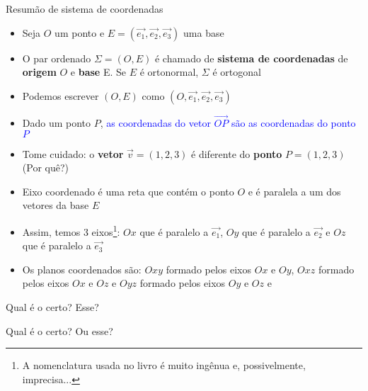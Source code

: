 \begin{frame}{Resumão de sistema de coordenadas}
    \begin{itemize}
        \item Seja \(O\) um ponto e \(E=(\vec{e_1},\vec{e_2},\vec{e_3})\) uma base
        \item O par ordenado \(\Sigma = (O,E)\) é chamado de \textbf{sistema de coordenadas} de \textbf{origem} 
            \(O\) e \textbf{base} E. Se \(E\) é ortonormal, \(\Sigma\) é ortogonal
        \item Podemos escrever \((O,E)\) como \((O,\vec{e_1},\vec{e_2},\vec{e_3})\)
        \item Dado um ponto \(P\), \textcolor{blue}{as coordenadas do vetor \(\vec{OP}\) são as coordenadas do ponto \(P\)}
        \item Tome cuidado: o \textbf{vetor} \(\vec{v}=(1,2,3)\) é diferente do \textbf{ponto} \(P=(1,2,3)\) \alert{(Por quê?)}
        \item Eixo coordenado é uma reta que contém o ponto \(O\) e é paralela a um dos vetores da base \(E\)
        \item Assim, temos 3 eixos\footnote{A nomenclatura usada no livro é muito ingênua e, possivelmente, imprecisa...}:
            \(Ox\) que é paralelo a \(\vec{e_1}\), \(Oy\) que é paralelo a \(\vec{e_2}\) e \(Oz\) que é paralelo a \(\vec{e_3}\)
        \item Os planos coordenados são: \(Oxy\) formado pelos eixos \(Ox\) e \(Oy\), 
            \(Oxz\) formado pelos eixos \(Ox\) e \(Oz\) e
            \(Oyz\) formado pelos eixos \(Oy\) e \(Oz\) e
    \end{itemize}
\end{frame}

\begin{frame}{Qual é o certo?}
    Esse?
    \begin{center}
    \end{center}
\end{frame}

\begin{frame}{Qual é o certo?}
    Ou esse?
    \begin{center}
    \end{center}
\end{frame}

